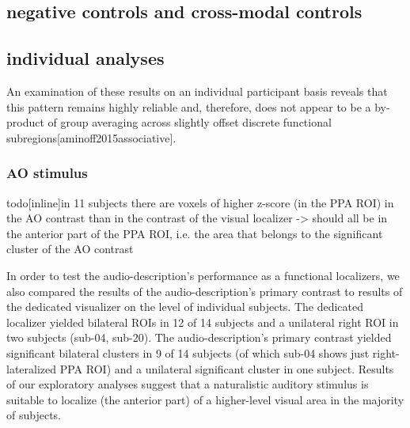 \documentclass[english]{article}
\begin{document}
\subsection{negative controls and cross-modal controls}



\subsection{individual analyses}

An examination of these results on an individual participant basis reveals that
this pattern remains highly reliable and, therefore, does not appear to be a
by-product of group averaging across slightly offset discrete functional
subregions[aminoff2015associative].


\subsubsection{AO stimulus}



todo[inline]{in 11 subjects there are voxels of higher z-score (in the PPA ROI)
    in the AO contrast than in the contrast of the visual localizer -> should
    all be in the anterior part of the PPA ROI, i.e. the area that belongs to
    the significant cluster of the AO contrast}



In order to test the audio-description's performance as a functional localizers,
we also compared the results of the audio-description's primary contrast to
results of the dedicated visualizer on the level of individual subjects.
The dedicated localizer \citep{sengupta2016extension} yielded bilateral ROIs in
12 of 14 subjects and a unilateral right ROI in two subjects (sub-04, sub-20).
The audio-description's primary contrast yielded significant bilateral clusters
in 9 of 14 subjects (of which sub-04 shows just right-lateralized PPA ROI)  and
a unilateral significant cluster in one subject.
Results of our exploratory analyses suggest that a naturalistic auditory
stimulus is suitable to localize (the anterior part) of a higher-level visual
area in the majority of subjects.
\end{document}
